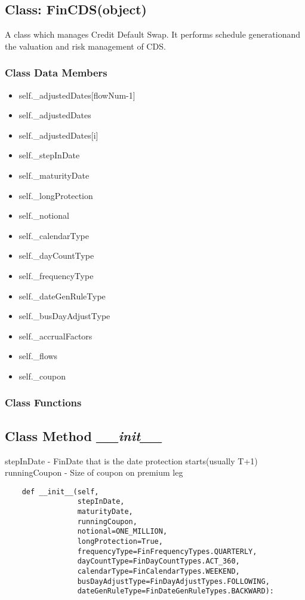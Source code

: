 \documentclass[twoside,11pt]{book}
\begin{document}
\subsection{Class: FinCDS(object)}
A class which manages Credit Default Swap. It performs schedule generationand the valuation and risk management of CDS. 

\subsubsection{Class Data Members}
\begin{itemize}
\item{self.\_adjustedDates[flowNum-1]}
\item{self.\_adjustedDates}
\item{self.\_adjustedDates[i]}
\item{self.\_stepInDate}
\item{self.\_maturityDate}
\item{self.\_longProtection}
\item{self.\_notional}
\item{self.\_calendarType}
\item{self.\_dayCountType}
\item{self.\_frequencyType}
\item{self.\_dateGenRuleType}
\item{self.\_busDayAdjustType}
\item{self.\_accrualFactors}
\item{self.\_flows}
\item{self.\_coupon}
\end{itemize}

\subsubsection{Class Functions}

\subsection{Class Method {\it \_\_init\_\_}}
stepInDate - FinDate that is the date protection starts(usually T+1) runningCoupon - Size of coupon on premium leg 

\begin{lstlisting}
    def __init__(self,
                 stepInDate,
                 maturityDate,
                 runningCoupon,
                 notional=ONE_MILLION,
                 longProtection=True,
                 frequencyType=FinFrequencyTypes.QUARTERLY,
                 dayCountType=FinDayCountTypes.ACT_360,
                 calendarType=FinCalendarTypes.WEEKEND,
                 busDayAdjustType=FinDayAdjustTypes.FOLLOWING,
                 dateGenRuleType=FinDateGenRuleTypes.BACKWARD):
\end{lstlisting}
\end{document}
